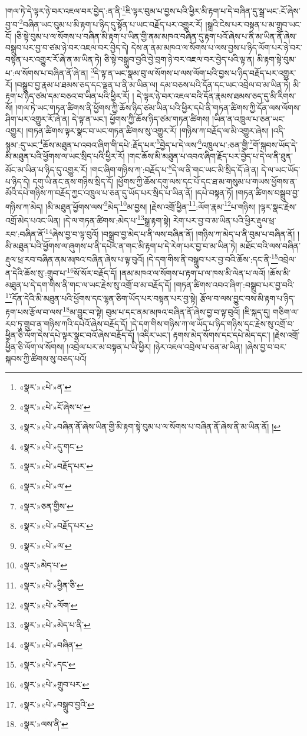 །གལ་ཏེ་དེ་ལྟར་ཉེ་བར་འཇལ་བར་བྱེད་:ན་ནི་\footnote{«སྣར་»«པེ་»ན་}ཇི་ལྟར་བུམ་པ་བྱས་པའི་ཕྱིར་མི་རྟག་པ་དེ་བཞིན་དུ་སྒྲ་ཡང་:ངོ་ཞེས་བྱ་བ་\footnote{«སྣར་»«པེ་»ངོ་ཞེས་པ་}བཞིན་ཡང་བུམ་པ་མི་རྟག་པ་ཉིད་དུ་སྟོན་པ་ཡང་བརྗོད་པར་འགྱུར་རོ། །སྒྲའི་ངེས་པར་བསྟན་པ་མ་གྲུབ་ཡང་ངོ། །ཅི་སྟེ་བུམ་པ་ལ་སོགས་པ་བཞིན་མི་རྟག་པ་ཡིན་གྱི་ནམ་མཁའ་བཞིན་དུ་རྟག་པའོ་ཞེས་པ་ནི་མ་ཡིན་ནོ་ཞེས་བསྒྲུབ་པར་བྱ་བ་ཙམ་ཉེ་བར་འཇལ་བར་བྱེད་དེ། དེས་ན་ནམ་མཁའ་ལ་སོགས་པ་ལས་བྱས་པ་ཉིད་ལོག་པར་ཉེ་བར་བསྟན་པར་འགྱུར་རོ་ཞེ་ན་མ་ཡིན་ཏེ། ཅི་སྟེ་བསྒྲུབ་བྱའི་བྱེ་བྲག་ཉེ་བར་འཇལ་བར་བྱེད་པའི་ལྟ་ན། མི་རྟག་སྟེ་བུམ་པ་:ལ་སོགས་པ་བཞིན་ནོ་ཞེ་ན། \footnote{«སྣར་»«པེ་»བཞིན་ནོ་ཞེས་ཡིན་གྱི་མི་རྟག་སྟེ་བུམ་པ་ལ་སོགས་པ་བཞིན་ནོ་ཞེས་ནི་མ་ཡིན་ནོ། ། }དེ་ལྟ་ན་ཡང་སྣམ་བུ་ལ་སོགས་པ་ལས་ལོག་པའི་བྱས་པ་ཉིད་བརྗོད་པར་འགྱུར་རོ། །བསྒྲུབ་བྱ་རྣམ་པ་ཐམས་ཅད་དང་ལྡན་པ་ནི་མ་ཡིན་ལ། དམ་བཅས་པའི་དོན་དང་ཡང་འབྲེལ་བ་མ་ཡིན་ཏེ། མི་རྟག་པ་ཉིད་ཙམ་དམ་བཅའ་བ་ཡིན་པའི་ཕྱིར་རོ། །
དེ་ལྟར་ཉེ་བར་འཇལ་བའི་དོན་རྣམས་ཐམས་ཅད་དུ་མི་རིགས་སོ། །གལ་ཏེ་ཡང་གཏན་ཚིགས་ནི་ཕྱོགས་ཀྱི་ཆོས་ཉིད་ཙམ་ཡིན་པའི་ཕྱིར་དཔེ་ནི་གཏན་ཚིགས་ཀྱི་དོན་ལས་ལོགས་ཤིག་པར་འགྱུར་རོ་ཞེ་ན། དེ་ལྟ་ན་ཡང་། ཕྱོགས་ཀྱི་ཆོས་ཉིད་ཙམ་གཏན་ཚིགས། །ཡིན་ན་འཁྲུལ་པ་ཅན་ཡང་འགྱུར། །གཏན་ཚིགས་ལྟར་སྣང་བ་ཡང་གཏན་ཚིགས་སུ་འགྱུར་རོ། །གཉིས་ཀ་བརྗོད་ལ་མི་འགྱུར་ཞེས། །འདི་སྙམ་:དུ་ཡང་\footnote{«སྣར་»«པེ་»དུ་གང་}ཆོས་མཐུན་པ་འབའ་ཞིག་གི་དཔེ་:རྗོད་པར་\footnote{«སྣར་»«པེ་»བརྗོད་པར་}བྱེད་པ་དེ་ལས་\footnote{«སྣར་»«པེ་»ལ་}འཁྲུལ་པ་:ཅན་གྱི་\footnote{«སྣར་»ཅན་གྱིས་}གོ་སྐབས་ཡོད་དེ་མི་མཐུན་པའི་ཕྱོགས་ལ་ཡང་སྲིད་པའི་ཕྱིར་རོ། །གང་ཆོས་མི་མཐུན་པ་འབའ་ཞིག་རྗོད་པར་བྱེད་པ་དེ་ལ་ནི་ཐུན་མོང་མ་ཡིན་པ་ཉིད་དུ་འགྱུར་རོ། །གང་ཞིག་གཉིས་ཀ་:བརྗོད་པ་\footnote{«སྣར་»«པེ་»བརྗོད་པར་}དེ་ལ་ནི་གང་ཡང་མི་སྲིད་དོ་ཞེ་ན། དེ་ལ་ཡང་ཡོད་པ་ཉིད་དེ། དགུ་ཡི་ནང་ནས་གཉིས་སྲིད་དོ། །ཕྱོགས་ཀྱི་ཆོས་དགུ་ལས་དང་པོ་དང་ཐ་མ་གསུམ་པ་གཡས་ཕྱོགས་ན་མོའི་དཔེ་གཉིས་ཀ་བརྗོད་ཀྱང་འཁྲུལ་པ་ཅན་དུ་ཡོད་པར་སྲིད་པ་ཡིན་ནོ། །དཔེ་བསྟན་ཏོ། །གཏན་ཚིགས་བསྒྲུབ་བྱ་གཉིས་ཀ་མེད། །མི་མཐུན་ཕྱོགས་ལས་\footnote{«སྣར་»«པེ་»ལ་}མེད་\footnote{«སྣར་»མེད་པ་}མ་བྱས། །རྗེས་འགྲོ་ཕྱིན་\footnote{«སྣར་»«པེ་»ཕྱིན་ཅི་}:ལོག་རྣམ་\footnote{«སྣར་»«པེ་»ལོག་}པ་གཉིས། །ལྟར་སྣང་རྗེས་འགྲོ་མེད་པའང་ཡིན། །དེ་ལ་གཏན་ཚིགས་:མེད་པ་\footnote{«སྣར་»«པེ་»མེད་པ་ནི་}སྒྲ་རྟག་སྟེ། རེག་པར་བྱ་བ་མ་ཡིན་པའི་ཕྱིར་རྡུལ་ཕྲ་རབ་:བཞིན་ནོ་\footnote{«སྣར་»«པེ་»བཞིན་}ཞེས་བྱ་བ་ལྟ་བུའོ། །བསྒྲུབ་བྱ་མེད་པ་ནི་ལས་བཞིན་ནོ། །གཉིས་ཀ་མེད་པ་ནི་བུམ་པ་བཞིན་ནོ། །མི་མཐུན་པའི་ཕྱོགས་ལ་ཞུགས་པ་ནི་དཔེར་ན་གང་མི་རྟག་པ་དེ་རེག་པར་བྱ་བ་མ་ཡིན་ཏེ། མཐོང་བའི་ལས་བཞིན་རྡུལ་ཕྲ་རབ་བཞིན་ནམ་མཁའ་བཞིན་ཞེས་པ་ལྟ་བུའོ། །དེ་དག་གིས་ནི་བསྒྲུབ་པར་བྱ་བའི་ཆོས་:དང་ནི་\footnote{«སྣར་»«པེ་»དང་}འབྲེལ་ན་དེའི་ཆོས་སུ་:གྲུབ་པ་\footnote{«སྣར་»«པེ་»གྲུབ་པར་}སོ་སོར་བརྗོད་དོ། །ནམ་མཁའ་ལ་སོགས་པ་རྟག་པ་ལ་ཁས་མི་ལེན་པ་ལའོ། །ཆོས་མི་མཐུན་པ་དེ་དག་གིས་ནི་གང་ལ་ཡང་རྗེས་སུ་འགྲོ་བ་མ་བརྗོད་དོ། །གཏན་ཚིགས་འབའ་ཞིག་:བསྒྲུབ་པར་བྱ་བའི་\footnote{«སྣར་»«པེ་»བསྒྲུབ་བྱའི་}དོན་དེའི་མི་མཐུན་པའི་ཕྱོགས་དང་ལྷན་ཅིག་ཡོད་པར་བསྟན་པར་བྱ་སྟེ། རྩོལ་བ་ལས་བྱུང་བས་མི་རྟག་པ་ཉིད་རྟག་པས་རྩོལ་བ་ལས་\footnote{«སྣར་»ལས་ནི་}མ་བྱུང་བ་སྟེ། བུམ་པ་དང་ནམ་མཁའ་བཞིན་ནོ་ཞེས་བྱ་བ་ལྟ་བུའོ། །ཇི་སྐད་དུ། གཅིག་ལ་རབ་ཏུ་གྲུབ་ན་གཉིས་ཀའི་དཔེའོ་ཞེས་བརྗོད་དོ། །དེ་དག་གིས་གཉིས་ཀ་ལ་ཡོད་པ་ཉིད་གཉིས་དང་རྗེས་སུ་འགྲོ་བ་ཕྱིན་ཅི་ལོག་དེས་དཔེ་ལྟར་སྣང་བའོ་ཞེས་བརྗོད་དོ། །འདིར་ཡང་། རྟགས་མེད་སོགས་དང་དཔེ་མེད་དང་། །རྗེས་འགྲོ་ཕྱིན་ཅི་ལོག་ལ་སོགས། །འབྲེལ་པར་མ་བསྟན་པ་ཡི་ཕྱིར། །ཉེར་འཇལ་འབྲེལ་པ་ཅན་མ་ཡིན། །ཞེས་བྱ་བ་བར་སྐབས་ཀྱི་ཚིགས་སུ་བཅད་པའོ། 
